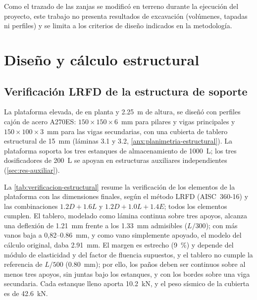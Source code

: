 Como el trazado de las zanjas se modificó en terreno durante la ejecución del proyecto, este trabajo no presenta resultados de excavación (volúmenes, tapadas ni perfiles) y se limita a los criterios de diseño indicados en la metodología.

\section{Diseño y cálculo estructural}
\label{sec:res-estructural}

\subsection{Verificación LRFD de la estructura de soporte}

La plataforma elevada, de  en planta y \qty{2.25}{\meter} de altura, se diseñó con perfiles cajón de acero A270ES: $150 \times 150 \times 6$~\unit{\milli\meter} para pilares y vigas principales y $150 \times 100 \times 3$~\unit{\milli\meter} para las vigas secundarias, con una cubierta de tablero estructural de \qty{15}{\milli\meter} (láminas 3.1 y 3.2, \cref{anx:planimetria-estructural}).
La plataforma soporta los tres estanques de almacenamiento de \qty{1000}{\liter}; los tres dosificadores de \qty{200}{\liter} se apoyan en estructuras auxiliares independientes (\cref{sec:res-auxiliar}).

La \cref{tab:verificacion-estructural} resume la verificación de los elementos de la plataforma con las dimensiones finales, según el método LRFD (AISC~360-16) y las combinaciones $\num{1.2}D + \num{1.6}L$ y $\num{1.2}D + \num{1.0}L + \num{1.4}E$; todos los elementos cumplen.
El tablero, modelado como lámina continua sobre tres apoyos, alcanza una deflexión de \qty{1.21}{\milli\meter} frente a los \qty{1.33}{\milli\meter} admisibles ($L/300$); con más vanos baja a 0,82--\qty{0.86}{\milli\meter}, y como vano simplemente apoyado, el modelo del cálculo original, daba \qty{2.91}{\milli\meter}.
El margen es estrecho (\qty{9}{\percent}) y depende del módulo de elasticidad y del factor de fluencia supuestos, y el tablero no cumple la referencia de $L/500$ (\qty{0.80}{\milli\meter}); por ello, los paños deben ser continuos sobre al menos tres apoyos, sin juntas bajo los estanques, y con los bordes sobre una viga secundaria.
Cada estanque lleno aporta \qty{10.2}{\kilo\newton}, y el peso sísmico de la cubierta es de \qty{42.6}{\kilo\newton}.

\begin{table}[htbp]
  \centering
  \caption{Verificación estructural de la plataforma y de la estructura auxiliar de los dosificadores (dimensiones finales: láminas 3.1--3.2 y EETT). Fuente: elaboración propia.}
  \label{tab:verificacion-estructural}
  
\end{table}

